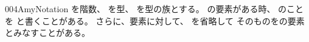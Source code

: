 \documentclass[index]{subfiles}
\begin{document}
\begin{myBlock}{004A}{myNotation}
  を階数、
  を型、
  を型の族とする。
  の要素がある時、
  のことを
  と書くことがある。
  さらに、要素に対して、
  を省略して
  そのものをの要素とみなすことがある。
\end{myBlock}
\end{document}

